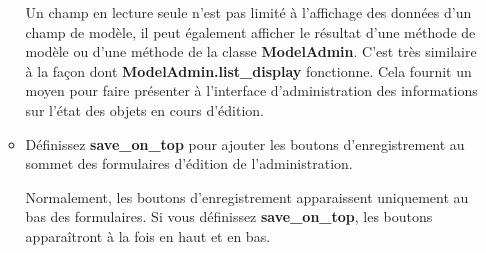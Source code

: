 \documentclass[11pt,a4paper]{article}
\begin{document}
\begin{enumerate}
\begin{itemize}
Un champ en lecture seule n’est pas limité à l’affichage des données d’un champ de modèle, il peut également afficher le résultat d’une méthode de modèle ou d’une méthode de la classe \textbf{ModelAdmin}. C’est très similaire à la façon dont \textbf{ModelAdmin.list\_display} fonctionne. Cela fournit un moyen pour faire présenter à l’interface d’administration des informations sur l’état des objets en cours d’édition.
		\item     Définissez \textbf{save\_on\_top} pour ajouter les boutons d’enregistrement au sommet des formulaires d’édition de l’administration.

    Normalement, les boutons d’enregistrement apparaissent uniquement au bas des formulaires. Si vous définissez \textbf{save\_on\_top}, les boutons apparaîtront à la fois en haut et en bas.


\end{itemize}
\end{enumerate}
\end{document}

